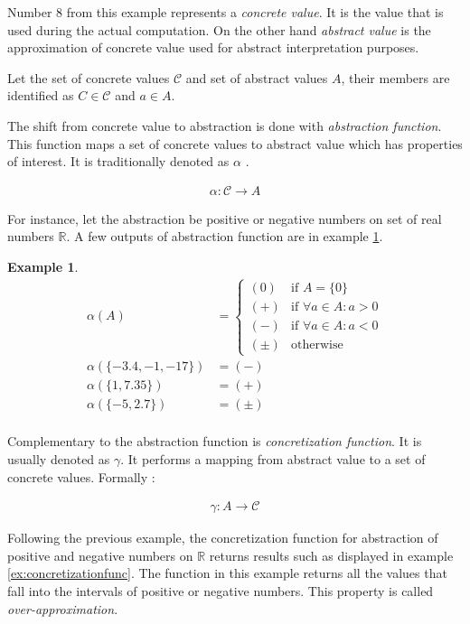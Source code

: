 \documentclass[12pt,final,oneside]{fithesis2}
\theoremstyle{definition}
\newtheorem{example}{Example}
\begin{document}
Number 8 from this example represents a \textit{concrete value}. It is
the value that is used during the actual computation. On the other hand
\textit{abstract value} is the approximation of concrete value used for
abstract interpretation purposes.

Let the set of concrete values $\mathcal{C}$ and set of abstract values $A$,
their members are identified as $C \in \mathcal{C}$ and $a \in A$.

The shift from concrete value to abstraction is done with
\textit{abstraction function}. This function maps a set of concrete values
to abstract value which has properties of interest. It is traditionally
denoted as $\alpha$ \cite{CousotCousot76-1}.

\begin{align*}
\alpha : \mathcal{C} \to A
\end{align*}

For instance, let the abstraction be positive or negative numbers on set of
real numbers $\mathbb{R}$. A few outputs of abstraction function are in
example \ref{ex:abstractionfunc}.

\begin{example}
\label{ex:abstractionfunc}
\begin{align*}
\alpha(A) &=
\begin{cases}
(0) & \text{if } A = \{ 0 \} \\
(+) & \text{if } \forall a \in A : a > 0 \\
(-) & \text{if } \forall a \in A : a < 0 \\
(\pm) & \text{otherwise}
\end{cases} \\
\alpha(\{ -3.4, -1, -17 \}) &= (-) \\
\alpha(\{ 1, 7.35 \}) &= (+) \\
\alpha(\{ -5, 2.7 \}) &= (\pm) \\
\end{align*}
\end{example}

Complementary to the abstraction function is \textit{concretization
function}. It is usually denoted as $\gamma$. It performs a mapping from
abstract value to a set of concrete values. Formally
\cite{CousotCousot76-1}:

\begin{align*}
\gamma : A \to \mathcal{C}
\end{align*}

Following the previous example, the concretization function for abstraction
of positive and negative numbers on $\mathbb{R}$ returns results such as
displayed in example \ref{ex:concretizationfunc}. The function in this
example returns all the values that fall into the intervals of positive
or negative numbers. This property is called \textit{over-approximation}.
\end{document}
